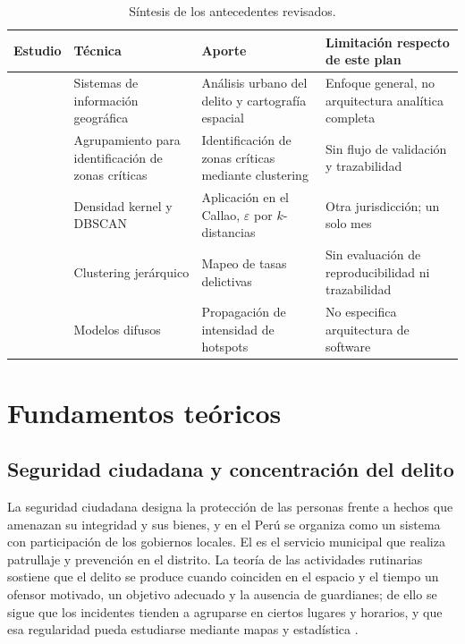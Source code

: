 \begin{table}[H]
\centering
\caption{Síntesis de los antecedentes revisados.}
\label{tab:estadoarte}
\begingroup\singlespacing\footnotesize
\begin{tabular}{@{}p{3.3cm}p{3.2cm}p{4.3cm}p{3.3cm}@{}}
\toprule
\textbf{Estudio} & \textbf{Técnica} & \textbf{Aporte} & \textbf{Limitación respecto de este plan} \\
\midrule
\citet{ristea2020crimegis} & Sistemas de información geográfica & Análisis urbano del delito y cartografía espacial & Enfoque general, no arquitectura analítica completa \\
\citet{hajela2020hotspot} & Agrupamiento para identificación de zonas críticas & Identificación de zonas críticas mediante clustering & Sin flujo de validación y trazabilidad \\
\citet{cutid2025} & Densidad kernel y DBSCAN & Aplicación en el Callao, $\varepsilon$ por $k$-distancias & Otra jurisdicción; un solo mes \\
\citet{gustriansyah2022crime} & Clustering jerárquico & Mapeo de tasas delictivas & Sin evaluación de reproducibilidad ni trazabilidad \\
\citet{cardone2022fuzzyhotspot} & Modelos difusos & Propagación de intensidad de hotspots & No especifica arquitectura de software \\
\bottomrule
\end{tabular}
\endgroup
{}
\end{table}

\section{Fundamentos teóricos}

\subsection{Seguridad ciudadana y concentración del delito}

La seguridad ciudadana designa la protección de las personas frente a hechos que amenazan su integridad y sus bienes, y en el Perú se organiza como un sistema con participación de los gobiernos locales. El  es el servicio municipal que realiza patrullaje y prevención en el distrito. La teoría de las actividades rutinarias sostiene que el delito se produce cuando coinciden en el espacio y el tiempo un ofensor motivado, un objetivo adecuado y la ausencia de guardianes; de ello se sigue que los incidentes tienden a agruparse en ciertos lugares y horarios, y que esa regularidad pueda estudiarse mediante mapas y estadística \citep{ristea2020crimegis,medinaariza2023hotspots}.

